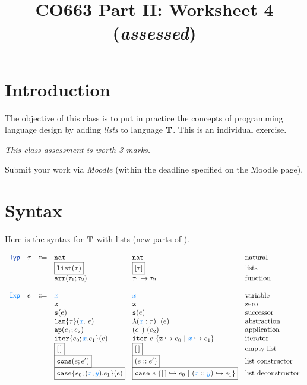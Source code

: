 \documentclass[11pt]{article}
\newcommand{\HL}[1]{\boxed{#1}}
\begin{document}
\title{CO663 Part II: Worksheet 4 (\emph{assessed})}

\date{\vspace{-15ex}} 
\maketitle


\newcommand{\lazyeval}[1]{\framebox{\parbox[c][#1]{\textwidth}{
      \color{white}{h}%
    }}}


\section{Introduction}

The objective of this class is to put in practice the concepts of
programming language design by adding \emph{lists} to language
$\textbf{T}$.
% 
This is an individual exercise.

\begin{center}
  \emph{This class assessment is worth {\color{red} 3} marks.}
\end{center}

Submit your work via \emph{Moodle} (within the deadline specified on the
Moodle page).


\section{Syntax} 

Here is the syntax for $\textbf{T}$ with lists (new parts of \HL{highlighted}).

\[
\begin{array}{llclll}
  \TYPES & \tau & \Coloneqq & \tynat  & \tynat & \text{natural}
  \\
         &&& \HL{\tylist{\tau}} &  \HL{ [\tau] } & \text{lists}
  \\
         &&& \tyarr{\tau_1}{\tau_2}  & \tau_1 \rightarrow \tau_2 & \text{function}
  \\
  \\ 
  \EXPS & e & \Coloneqq & \var{x} & \var{x} & \text{variable}
  \\
         &&& \ez &  \ez & \text{zero}
  \\
         &&& \esucc{e} &  \esucc{e} & \text{successor}
  \\
         &&& \elam{\tau}{x}{e} & \clam{\tau}{x}{e} & \text{abstraction}
  \\
         &&& \eapp{e_1}{e_2} & \capp{e_1}{e_2} & \text{application}
  \\
         &&& \eiter{e_0}{x}{e_1}{e} & {\citer{e_0}{x}{e_1}{e}}   & \text{iterator}
  \\
         &&& \HL{[\,]} & \HL{[\,]} & \text{empty list}
  \\
         &&& \HL{\econs{e}{e'}} & \HL{\ccons{e}{e'}} & \text{list constructor}
  \\                                   
         &&& \HL{\edeclist{e_0}{x}{y}{e_1}{e}} & \HL{{\cdeclist{e_0}{x}{y}{e_1}{e}}}   &\text{list deconstructor}
\end{array}
\]
\end{document}
